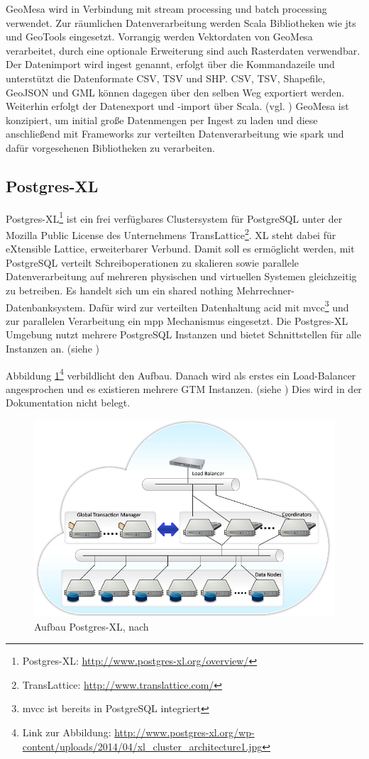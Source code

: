 GeoMesa wird in Verbindung mit stream processing und batch processing verwendet.
Zur räumlichen Datenverarbeitung werden Scala Bibliotheken wie \Gls{jts} und GeoTools eingesetzt.
Vorrangig werden Vektordaten von GeoMesa verarbeitet, durch eine optionale Erweiterung sind auch Rasterdaten verwendbar.
Der Datenimport wird ingest genannt, erfolgt über die Kommandazeile und unterstützt die Datenformate CSV, TSV und SHP.
CSV, TSV, Shapefile, GeoJSON und GML können dagegen über den selben Weg exportiert werden.
Weiterhin erfolgt der Datenexport und -import über Scala. (vgl. \cite{website:geomesa-ingest})
GeoMesa ist konzipiert, um initial große Datenmengen per Ingest zu laden und diese anschließend mit Frameworks zur verteilten Datenverarbeitung wie \Gls{spark} und dafür vorgesehenen Bibliotheken zu verarbeiten.

\subsection{Postgres-XL}
\label{grundlagen:postgresxl}
Postgres-XL\footnote{Postgres-XL: \url{http://www.postgres-xl.org/overview/}} ist ein frei verfügbares Clustersystem für PostgreSQL unter der Mozilla Public License des Unternehmens TransLattice\footnote{TransLattice: \url{http://www.translattice.com/}}.
XL steht dabei für eXtensible Lattice, erweiterbarer Verbund.
Damit soll es ermöglicht werden, mit PostgreSQL verteilt Schreiboperationen zu skalieren sowie parallele Datenverarbeitung auf mehreren physischen und virtuellen Systemen gleichzeitig zu betreiben.
Es handelt sich um ein shared nothing Mehrrechner-Datenbanksystem.
Dafür wird zur verteilten Datenhaltung \Gls{acid} mit \Gls{mvcc}\footnote{\Gls{mvcc} ist bereits in PostgreSQL integriert} und zur parallelen Verarbeitung ein \Gls{mpp} Mechanismus eingesetzt.
Die Postgres-XL Umgebung nutzt mehrere PostgreSQL Instanzen und bietet Schnittstellen für alle Instanzen an. (siehe \cite{website:postgresxl-about})

Abbildung \ref{fig:postgresxl}\footnote{Link zur Abbildung: \url{http://www.postgres-xl.org/wp-content/uploads/2014/04/xl_cluster_architecture1.jpg}} verbildlicht den Aufbau.
Danach wird als erstes ein Load-Balancer angesprochen und es existieren mehrere GTM Instanzen. (siehe \cite{website:postgresxl-about})
Dies wird in der Dokumentation nicht belegt.
\begin{figure}[hp]
\centering
\includegraphics[width=.7\textwidth]{Abbildungen/postgresxl-structure.jpg}
\caption[Aufbau Postgres-XL]{Aufbau Postgres-XL, nach \cite{website:postgresxl-overview}}
\label{fig:postgresxl}
\end{figure}

